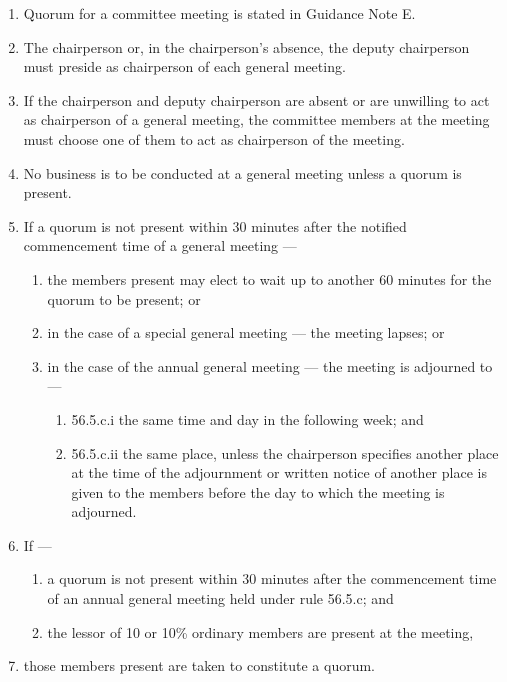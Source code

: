 \begin{enumerate}

\item Quorum for a committee meeting is stated in Guidance Note E.
\item The chairperson or, in the chairperson's absence, the deputy chairperson must preside as chairperson of each general meeting.
\item If the chairperson and deputy chairperson are absent or are unwilling to act as chairperson of a general meeting, the committee members at the meeting must choose one of them to act as chairperson of the meeting.
\item No business is to be conducted at a general meeting unless a quorum is present.
\item If a quorum is not present within 30 minutes after the notified commencement time of a general meeting ---

  \begin{enumerate}
  
  \item the members present may elect to wait up to another 60 minutes for the quorum to be present; or
  \item in the case of a special general meeting --- the meeting lapses; or
  \item in the case of the annual general meeting --- the meeting is adjourned to ---

    \begin{enumerate}
    
    \item 56.5.c.i the same time and day in the following week; and
    \item 56.5.c.ii the same place, unless the chairperson specifies another place at the time of the adjournment or written notice of another place is given to the members before the day to which the meeting is adjourned.
    \end{enumerate}
  \end{enumerate}
\item If ---

  \begin{enumerate}
  
  \item a quorum is not present within 30 minutes after the commencement time of an annual general meeting held under rule 56.5.c; and
  \item the lessor of 10 or 10\% ordinary members are present at the meeting,
  \end{enumerate}
\item those members present are taken to constitute a quorum.
\end{enumerate}

